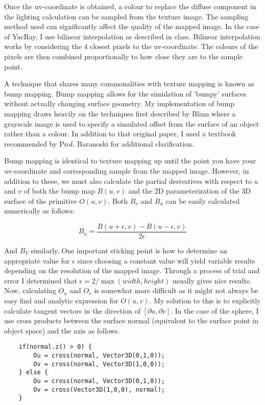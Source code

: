 \documentclass[12pt]{article}
\begin{document}
Once the uv-coordinate is obtained, a colour to replace the diffuse component in the lighting calculation can be sampled from the texture image. The sampling method used can significantly affect the quality of the mapped image. In the case of YacRay, I use bilinear interpolation as described in class. Bilinear interpolation works by considering the 4 closest pixels to the uv-coordinate. The colours of the pixels are then combined proportionally to how close they are to the sample point.

A technique that shares many commonalities with texture mapping is known as bump mapping. Bump mapping allows for the simulation of 'bumpy' surfaces without actually changing surface geometry. My implementation of bump mapping draws heavily on the techniques first described by Blinn\cite{bump} where a grayscale image is used to specify a simulated offset from the surface of an object rather than a colour. In addition to that original paper, I used a textbook recommended by Prof. Baranoski for additional clarification\cite{bump2}.

Bump mapping is identical to texture mapping up until the point you have your uv-coordinate and corresponding sample from the mapped image. However, in addition to these, we must also calculate the partial derivatives with respect to $u$ and $v$ of both the bump map $B(u,v)$ and the 2D parameterization of the 3D surface of the primitive $O(u,v)$. Both $B_v$ and $B_u$ can be easily calculated numerically as follows:

$$B_u= \frac{B(u+\epsilon,v)-B(u-\epsilon,v)}{2\epsilon}$$

And $B_V$ similarly. One important sticking point is how to determine an appropriate value for $\epsilon$ since choosing a constant value will yield variable results depending on the resolution of the mapped image. Through a process of trial and error I determined that $\epsilon=2/\max(width,height)$ usually gives nice results.
Now, calculating $O_u$ and $O_v$ is somewhat more difficult as it might not always be easy find and analytic expression for $O(u,v)$. My solution to this is to explicitly calculate tangent vectors in the direction of $[\partial u, \partial v]$. In the case of the sphere, I use cross products between the surface normal (equivalent to the surface point in object space) and the axis as follows.
\begin{verbatim}
	if(normal.z() > 0) {
		Ou = cross(normal, Vector3D(0,1,0));
		Ov = cross(normal, Vector3D(1,0,0));
	} else {
		Ou = cross(normal, Vector3D(0,1,0));
		Ov = cross(Vector3D(1,0,0), normal);
	}
\end{verbatim}
\end{document}
